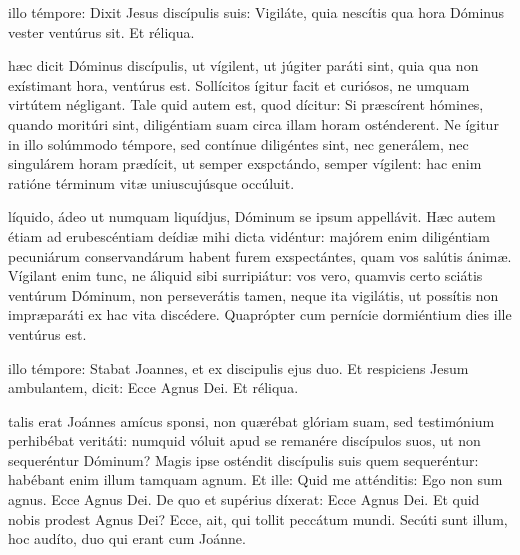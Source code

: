 \documentclass[fontsize=9pt,paper=A6,twoside,BCOR=1mm,DIV=22,headinclude]{scrarticle}
\begin{document}
\begin{multicols}{2}
{\RVCPvi 

 illo témpore: Dixit Jesus discípulis suis: Vigiláte, quia nescítis qua hora Dóminus vester ventúrus sit. Et réliqua.

}

{
 hæc dicit Dóminus discípulis, ut vígilent, ut júgiter paráti sint, quia qua non exístimant hora, ventúrus est. Sollícitos ígitur facit et curiósos, ne umquam virtútem négligant. Tale quid autem est, quod dícitur: Si præscírent hómines, quando moritúri sint, diligéntiam suam circa illam horam osténderent. Ne ígitur in illo solúmmodo témpore, sed contínue diligéntes sint, nec generálem, nec singulárem horam prædícit, ut semper exspctándo, semper vígilent: hac enim ratióne términum vitæ uniuscujúsque occúluit. 

\RVCPvii 


}

 líquido, ádeo ut numquam liquídjus, Dóminum se ipsum appellávit. Hæc autem étiam ad erubescéntiam deídiæ mihi dicta vidéntur: majórem enim diligéntiam pecuniárum conservandárum habent furem exspectántes, quam vos salútis ánimæ. Vígilant enim tunc, ne áliquid sibi surripiátur: vos vero, quamvis certo sciátis ventúrum Dóminum, non perseverátis tamen, neque ita vigilátis, ut possítis non impræparáti ex hac vita discédere. Quaprópter cum pernície dormiéntium dies ille ventúrus est.


\RVCPviii 

 illo témpore: Stabat Joannes, et ex discipulis ejus duo. Et respiciens Jesum ambulantem, dicit: Ecce Agnus Dei. Et réliqua.

 talis erat Joánnes amícus sponsi, non quærébat glóriam suam, sed testimónium perhibébat veritáti: numquid vóluit apud se remanére discípulos suos, ut non sequeréntur Dóminum? Magis ipse osténdit discípulis suis quem sequeréntur: habébant enim illum tamquam agnum. Et ille: Quid me atténditis: Ego non sum agnus. Ecce Agnus Dei. De quo et supérius díxerat: Ecce Agnus Dei. Et quid nobis prodest Agnus Dei? Ecce, ait, qui tollit peccátum mundi. Secúti sunt illum, hoc audíto, duo qui erant cum Joánne.


\end{multicols}
\end{document}
